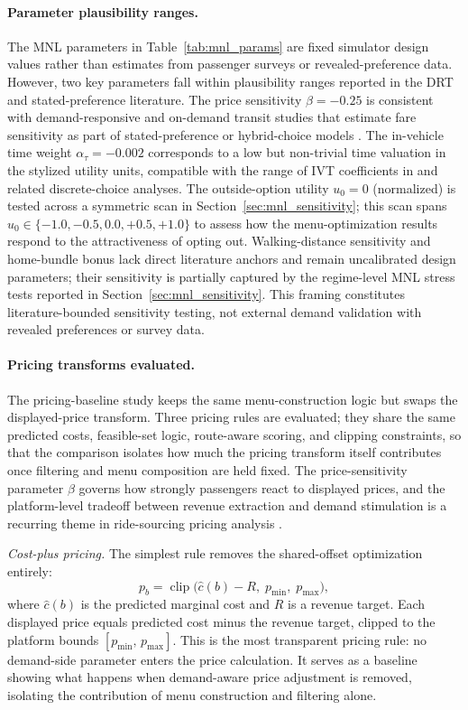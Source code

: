 \paragraph{Parameter plausibility ranges.}
The MNL parameters in Table~\ref{tab:mnl_params} are fixed simulator design values rather than estimates from passenger surveys or revealed-preference data. However, two key parameters fall within plausibility ranges reported in the DRT and stated-preference literature. The price sensitivity $\beta = -0.25$ is consistent with demand-responsive and on-demand transit studies that estimate fare sensitivity as part of stated-preference or hybrid-choice models \citep{frei2017flexing,alsaleh2023ondemand}. The in-vehicle time weight $\alpha_{\tau} = -0.002$ corresponds to a low but non-trivial time valuation in the stylized utility units, compatible with the range of IVT coefficients in \citet{ben1985discrete} and related discrete-choice analyses. The outside-option utility $u_0 = 0$ (normalized) is tested across a symmetric scan in Section~\ref{sec:mnl_sensitivity}; this scan spans $u_0 \in \{-1.0, -0.5, 0.0, +0.5, +1.0\}$ to assess how the menu-optimization results respond to the attractiveness of opting out. Walking-distance sensitivity and home-bundle bonus lack direct literature anchors and remain uncalibrated design parameters; their sensitivity is partially captured by the regime-level MNL stress tests reported in Section~\ref{sec:mnl_sensitivity}. This framing constitutes literature-bounded sensitivity testing, not external demand validation with revealed preferences or survey data.

\paragraph{Pricing transforms evaluated.} The pricing-baseline study keeps the same menu-construction logic but swaps the displayed-price transform. Three pricing rules are evaluated; they share the same predicted costs, feasible-set logic, route-aware scoring, and clipping constraints, so that the comparison isolates how much the pricing transform itself contributes once filtering and menu composition are held fixed. The price-sensitivity parameter $\beta$ governs how strongly passengers react to displayed prices, and the platform-level tradeoff between revenue extraction and demand stimulation is a recurring theme in ride-sourcing pricing analysis \citep{zha2018surge}.

\emph{Cost-plus pricing.} The simplest rule removes the shared-offset optimization entirely:
\[
  p_b = \operatorname{clip}\!\bigl(\hat{c}(b) - R,\; p_{\min},\; p_{\max}\bigr),
\]
where $\hat{c}(b)$ is the predicted marginal cost and $R$ is a revenue target. Each displayed price equals predicted cost minus the revenue target, clipped to the platform bounds $[p_{\min},\, p_{\max}]$. This is the most transparent pricing rule: no demand-side parameter enters the price calculation. It serves as a baseline showing what happens when demand-aware price adjustment is removed, isolating the contribution of menu construction and filtering alone.

